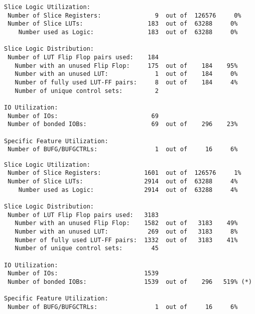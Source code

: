 \begin{verbatim}
Slice Logic Utilization: 
 Number of Slice Registers:               9  out of  126576     0%  
 Number of Slice LUTs:                  183  out of  63288     0%  
    Number used as Logic:               183  out of  63288     0%  

Slice Logic Distribution: 
 Number of LUT Flip Flop pairs used:    184
   Number with an unused Flip Flop:     175  out of    184    95%  
   Number with an unused LUT:             1  out of    184     0%  
   Number of fully used LUT-FF pairs:     8  out of    184     4%  
   Number of unique control sets:         2

IO Utilization: 
 Number of IOs:                          69
 Number of bonded IOBs:                  69  out of    296    23%  

Specific Feature Utilization:
 Number of BUFG/BUFGCTRLs:                1  out of     16     6%  
\end{verbatim}

\begin{verbatim}
Slice Logic Utilization: 
 Number of Slice Registers:            1601  out of  126576     1%  
 Number of Slice LUTs:                 2914  out of  63288     4%  
    Number used as Logic:              2914  out of  63288     4%  

Slice Logic Distribution: 
 Number of LUT Flip Flop pairs used:   3183
   Number with an unused Flip Flop:    1582  out of   3183    49%  
   Number with an unused LUT:           269  out of   3183     8%  
   Number of fully used LUT-FF pairs:  1332  out of   3183    41%  
   Number of unique control sets:        45

IO Utilization: 
 Number of IOs:                        1539
 Number of bonded IOBs:                1539  out of    296   519% (*) 

Specific Feature Utilization:
 Number of BUFG/BUFGCTRLs:                1  out of     16     6%  
\end{verbatim}

